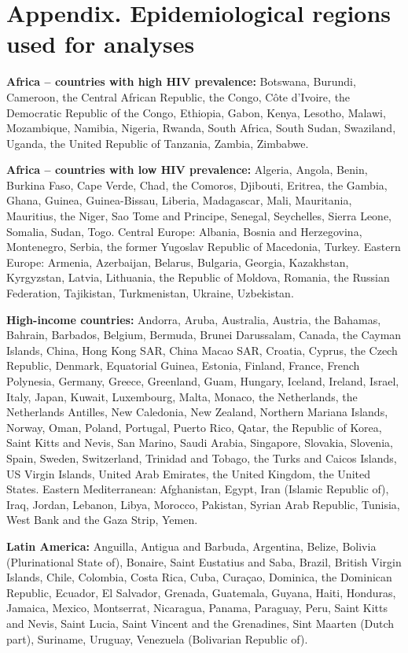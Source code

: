\section*{Appendix. Epidemiological regions used for analyses}

\textbf{Africa – countries with high HIV prevalence:} Botswana, Burundi, Cameroon, the Central African Republic, the Congo, Côte d’Ivoire, the Democratic Republic of the Congo, Ethiopia, Gabon, Kenya, Lesotho, Malawi, Mozambique, Namibia, Nigeria, Rwanda, South Africa, South Sudan, Swaziland, Uganda, the United Republic of Tanzania, Zambia, Zimbabwe. 

\textbf{Africa – countries with low HIV prevalence:} Algeria, Angola, Benin, Burkina Faso, Cape Verde, Chad, the Comoros, Djibouti, Eritrea, the Gambia, Ghana, Guinea, Guinea-Bissau, Liberia, Madagascar, Mali, Mauritania, Mauritius, the Niger, Sao Tome and Principe, Senegal, Seychelles, Sierra Leone, Somalia, Sudan, Togo.
Central Europe: Albania, Bosnia and Herzegovina, Montenegro, Serbia, the former Yugoslav Republic of Macedonia, Turkey.
Eastern Europe: Armenia, Azerbaijan, Belarus, Bulgaria, Georgia, Kazakhstan, Kyrgyzstan, Latvia, Lithuania, the Republic of Moldova, Romania, the Russian Federation, Tajikistan, Turkmenistan, Ukraine, Uzbekistan.

\textbf{High-income countries:} Andorra, Aruba, Australia, Austria, the Bahamas, Bahrain, Barbados, Belgium, Bermuda, Brunei Darussalam, Canada, the Cayman Islands, China, Hong Kong SAR, China Macao SAR, Croatia, Cyprus, the Czech Republic, Denmark, Equatorial Guinea, Estonia, Finland, France, French Polynesia, Germany, Greece, Greenland, Guam, Hungary, Iceland, Ireland, Israel, Italy, Japan, Kuwait, Luxembourg, Malta, Monaco, the Netherlands, the Netherlands Antilles, New Caledonia, New Zealand, Northern Mariana Islands, Norway, Oman, Poland, Portugal, Puerto Rico, Qatar, the Republic of Korea, Saint Kitts and Nevis, San Marino, Saudi Arabia, Singapore, Slovakia, Slovenia, Spain, Sweden, Switzerland, Trinidad and Tobago, the Turks and Caicos Islands, US Virgin Islands, United Arab Emirates, the United Kingdom, the United States.
Eastern Mediterranean: Afghanistan, Egypt, Iran (Islamic Republic of), Iraq, Jordan, Lebanon, Libya, Morocco, Pakistan, Syrian Arab Republic, Tunisia, West Bank and the Gaza Strip, Yemen. 

\textbf{Latin America:} Anguilla, Antigua and Barbuda, Argentina, Belize, Bolivia (Plurinational State of), Bonaire, Saint Eustatius and Saba, Brazil, British Virgin Islands, Chile, Colombia, Costa Rica, Cuba, Curaçao, Dominica, the Dominican Republic, Ecuador, El Salvador, Grenada, Guatemala, Guyana, Haiti, Honduras, Jamaica, Mexico, Montserrat, Nicaragua, Panama, Paraguay, Peru, Saint Kitts and Nevis, Saint Lucia, Saint Vincent and the Grenadines, Sint Maarten (Dutch part), Suriname, Uruguay, Venezuela (Bolivarian Republic of).

